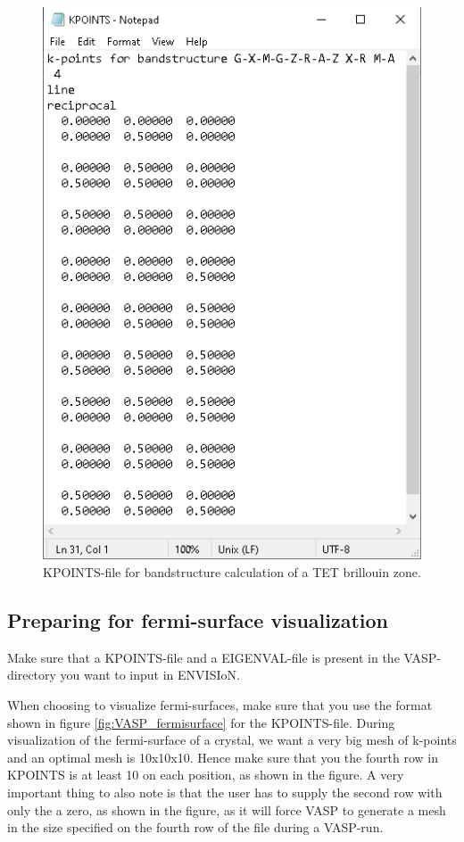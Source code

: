 \begin{figure}[H]
    \centering
    \includegraphics[scale = 0.53]{images/usermanual_band_TET.png}
    \caption{KPOINTS-file for bandstructure calculation of a TET brillouin zone.}
    \label{fig:VASP_band}
\end{figure}

\subsection{Preparing for fermi-surface visualization}

Make sure that a KPOINTS-file and a EIGENVAL-file is present in the VASP-directory you want to input in ENVISIoN. 

When choosing to visualize fermi-surfaces, make sure that you use the format shown in figure \ref{fig:VASP_fermisurface} for the KPOINTS-file. During visualization of the fermi-surface of a crystal, we want a very big mesh of k-points and an optimal mesh is 10x10x10. Hence make sure that you the fourth row in KPOINTS is at least 10 on each position, as shown in the figure. A very important thing to also note is that the user has to supply the second row with only the a zero, as shown in the figure, as it will force VASP to generate a mesh in the size specified on the fourth row of the file during a VASP-run.

